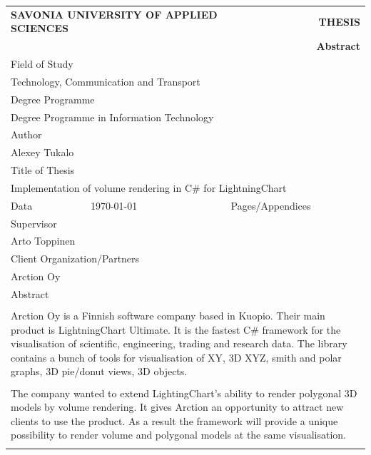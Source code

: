 \documentclass[twoside, english, 11pt]{report}
\begin{document}
\begin{table}[!h]
\begin{tabular}{| l | l | l | l |}
\multicolumn{2}{l}{\textbf{SAVONIA UNIVERSITY OF APPLIED SCIENCES}}&
\multicolumn{2}{r}{\textbf{THESIS}}\\
\multicolumn{4}{r}{\textbf{Abstract}}\\
\hline
\multicolumn{4}{|l|}{Field of Study}\\
\multicolumn{4}{|l|}{Technology, Communication and Transport}\\
\hline
\multicolumn{4}{|l|}{Degree Programme}\\
\multicolumn{4}{|l|}{Degree Programme in Information Technology}\\
\hline
\multicolumn{4}{|l|}{Author}\\
\multicolumn{4}{|l|}{Alexey Tukalo}\\
\hline
\multicolumn{4}{|l|}{Title of Thesis}\\
\multicolumn{4}{|l|}{Implementation of volume rendering in C\# for LightningChart}\\
\hline
Data & \today & Pages/Appendices & \pageref{LastPage}\\
\hline
\multicolumn{4}{|l|}{Supervisor}\\
\multicolumn{4}{|l|}{Arto Toppinen}\\
\hline
\multicolumn{4}{|l|}{Client Organization/Partners}\\
\multicolumn{4}{|l|}{Arction Oy}\\
\hline
\multicolumn{4}{|l|}{Abstract}\\
\multicolumn{4}{|l|}{ }\\
\multicolumn{4}{|p{14cm}|}{
Arction Oy is a Finnish software company based in Kuopio. Their main product is LightningChart Ultimate. It is the fastest C\# framework for the visualisation of scientific, engineering, trading and research data. The library contains a bunch of tools for visualisation of XY, 3D XYZ, smith and polar graphs, 3D pie/donut views, 3D objects.
}\\
\multicolumn{4}{|l|}{ }\\
\multicolumn{4}{|p{14cm}|}{
The company wanted to extend LightingChart's ability to render polygonal 3D models by volume rendering. It gives Arction an opportunity to attract new clients to use the product. As a result the framework will provide a unique possibility to render volume and polygonal models at the same visualisation.
}\\
\multicolumn{4}{|l|}{ }\\

\end{tabular}
\end{table}
\end{document}
